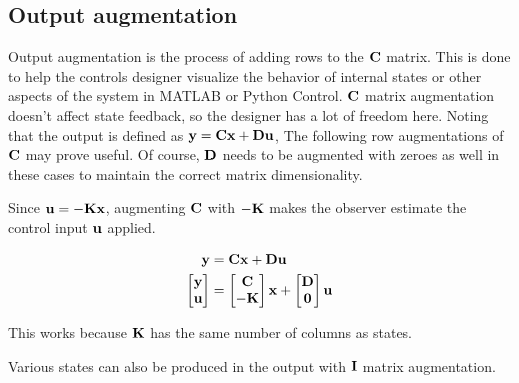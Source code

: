 \subsection{Output augmentation}

Output augmentation is the process of adding rows to the $\mathbf{C}$ matrix. This
is done to help the controls designer visualize the behavior of internal states
or other aspects of the \gls{system} in MATLAB or Python Control. $\mathbf{C}$
matrix augmentation doesn't affect \gls{state} feedback, so the designer has a
lot of freedom here. Noting that the \gls{output} is defined as
$\mathbf{y} = \mathbf{C}\mathbf{x} + \mathbf{D}\mathbf{u}$, The following row augmentations of
$\mathbf{C}$ may prove useful. Of course, $\mathbf{D}$ needs to be augmented with
zeroes as well in these cases to maintain the correct matrix dimensionality.

Since $\mathbf{u} = -\mathbf{K}\mathbf{x}$, augmenting $\mathbf{C}$ with $-\mathbf{K}$ makes
the \gls{observer} estimate the \gls{control input} $\mathbf{u}$ applied.

\begin{align*}
  \mathbf{y} &= \mathbf{C}\mathbf{x} + \mathbf{D}\mathbf{u} \\
  \begin{bmatrix}
    \mathbf{y} \\
    \mathbf{u}
  \end{bmatrix} &=
  \begin{bmatrix}
    \mathbf{C} \\
    -\mathbf{K}
  \end{bmatrix}
  \mathbf{x} +
  \begin{bmatrix}
    \mathbf{D} \\
    \mathbf{0}
  \end{bmatrix}
  \mathbf{u}
\end{align*}

This works because $\mathbf{K}$ has the same number of columns as \glspl{state}.

Various \glspl{state} can also be produced in the \gls{output} with $\mathbf{I}$
matrix augmentation.
